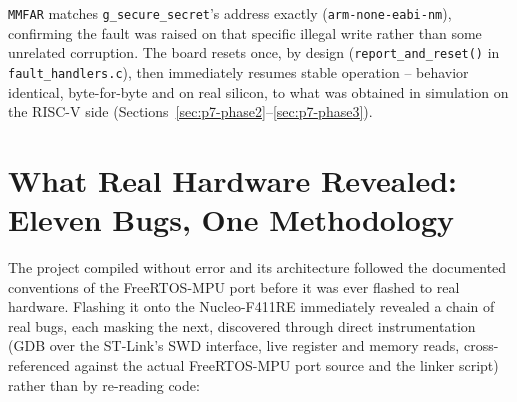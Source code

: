 \documentclass[sigconf,nonacm]{acmart}
\begin{document}
\texttt{MMFAR} matches \texttt{g\_secure\_secret}'s address exactly (\texttt{arm-none-eabi-nm}), confirming the fault was raised on that specific illegal write rather than some unrelated corruption. The board resets once, by design (\texttt{report\_and\_reset()} in \texttt{fault\_handlers.c}), then immediately resumes stable operation -- behavior identical, byte-for-byte and on real silicon, to what was obtained in simulation on the RISC-V side (Sections~\ref{sec:p7-phase2}--\ref{sec:p7-phase3}).

\section{What Real Hardware Revealed: Eleven Bugs, One Methodology}
\label{sec:bugs}

The project compiled without error and its architecture followed the documented conventions of the FreeRTOS-MPU port before it was ever flashed to real hardware. Flashing it onto the Nucleo-F411RE immediately revealed a chain of real bugs, each masking the next, discovered through direct instrumentation (GDB over the ST-Link's SWD interface, live register and memory reads, cross-referenced against the actual FreeRTOS-MPU port source and the linker script) rather than by re-reading code:
\end{document}
